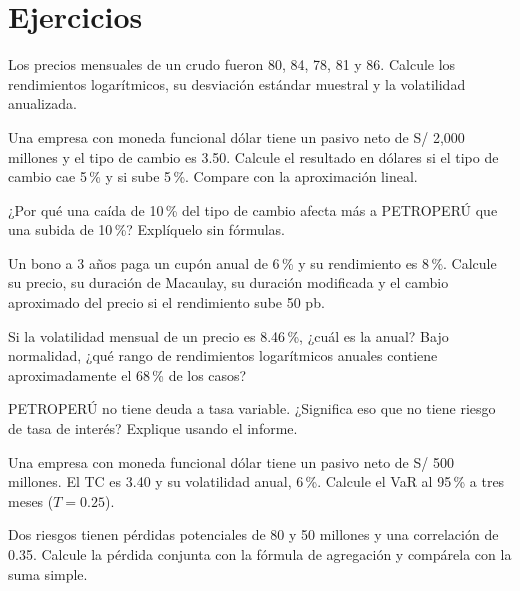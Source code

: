 \section*{Ejercicios}

\ejercicio[cálculo] Los precios mensuales de un crudo fueron 80, 84, 78, 81 y 86. Calcule los rendimientos logarítmicos, su desviación estándar muestral y la volatilidad anualizada.

\ejercicio[cálculo] Una empresa con moneda funcional dólar tiene un pasivo neto de S/ 2,000 millones y el tipo de cambio es 3.50. Calcule el resultado en dólares si el tipo de cambio cae 5\,\% y si sube 5\,\%. Compare con la aproximación lineal.

\ejercicio[conceptual] ¿Por qué una caída de 10\,\% del tipo de cambio afecta más a PETROPERÚ que una subida de 10\,\%? Explíquelo sin fórmulas.

\ejercicio[cálculo] Un bono a 3 años paga un cupón anual de 6\,\% y su rendimiento es 8\,\%. Calcule su precio, su duración de Macaulay, su duración modificada y el cambio aproximado del precio si el rendimiento sube 50 pb.

\ejercicio[cálculo] Si la volatilidad mensual de un precio es 8.46\,\%, ¿cuál es la anual? Bajo normalidad, ¿qué rango de rendimientos logarítmicos anuales contiene aproximadamente el 68\,\% de los casos?

\ejercicio[conceptual] PETROPERÚ no tiene deuda a tasa variable. ¿Significa eso que no tiene riesgo de tasa de interés? Explique usando el informe.

\ejercicio[cálculo] Una empresa con moneda funcional dólar tiene un pasivo neto de S/ 500 millones. El TC es 3.40 y su volatilidad anual, 6\,\%. Calcule el VaR al 95\,\% a tres meses ($T=0.25$).

\ejercicio[cálculo] Dos riesgos tienen pérdidas potenciales de 80 y 50 millones y una correlación de 0.35. Calcule la pérdida conjunta con la fórmula de agregación y compárela con la suma simple.
